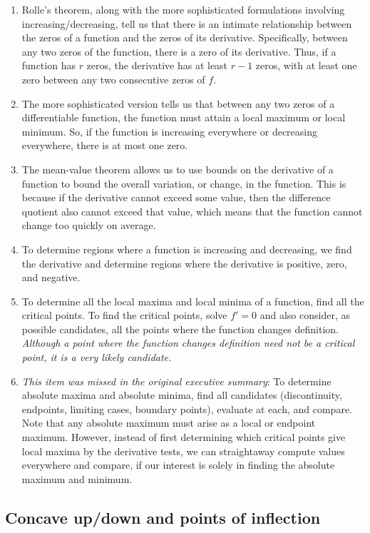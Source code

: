 \documentclass[10pt]{amsart}
\begin{document}
\begin{enumerate}
\item Rolle's theorem, along with the more sophisticated formulations
  involving increasing/decreasing, tell us that there is an intimate
  relationship between the zeros of a function and the zeros of its
  derivative. Specifically, between any two zeros of the function,
  there is a zero of its derivative. Thus, if a function has $r$
  zeros, the derivative has at least $r - 1$ zeros, with at least one
  zero between any two consecutive zeros of $f$.
\item The more sophisticated version tells us that between any two
  zeros of a differentiable function, the function must attain a local
  maximum or local minimum. So, if the function is increasing
  everywhere or decreasing everywhere, there is at most one zero.
\item The mean-value theorem allows us to use bounds on the derivative
  of a function to bound the overall variation, or change, in the
  function. This is because if the derivative cannot exceed some
  value, then the difference quotient also cannot exceed that value,
  which means that the function cannot change too quickly on average.
\item To determine regions where a function is increasing and
  decreasing, we find the derivative and determine regions where the
  derivative is positive, zero, and negative.
\item To determine all the local maxima and local minima of a
  function, find all the critical points. To find the critical points,
  solve $f' = 0$ and also consider, as possible candidates, all the
  points where the function changes definition. {\em Although a point
  where the function changes definition need not be a critical point,
  it is a very likely candidate.}
\item {\em This item was missed in the original executive summary}: To
  determine absolute maxima and absolute minima, find all candidates
  (discontinuity, endpoints, limiting cases, boundary points),
  evaluate at each, and compare. Note that any absolute maximum must
  arise as a local or endpoint maximum. However, instead of first
  determining which critical points give local maxima by the
  derivative tests, we can straightaway compute values everywhere and
  compare, if our interest is solely in finding the absolute maximum
  and minimum.
\end{enumerate}

\subsection{Concave up/down and points of inflection}
\end{document}
